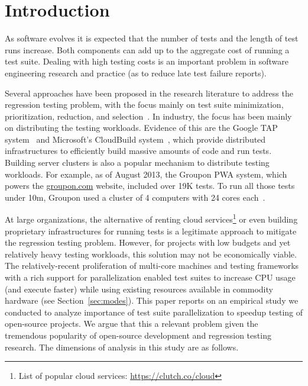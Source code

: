 \section{Introduction}


As software evolves it is expected that the number of tests and the
length of test runs increase.  Both components can add up to the
aggregate cost of running a test suite.  Dealing with high testing
costs is an important problem in software engineering research and
practice (as to reduce late test failure reports).

Several approaches have been proposed in the research literature to
address the regression testing problem, with the focus mainly on test
suite minimization, prioritization, reduction, and
selection~\cite{yoo-harman-stvr2012}.  In industry, the focus has been
mainly on distributing the testing workloads.  Evidence of this are
the Google TAP system~\cite{google-tap,google-ci} and Microsoft's
CloudBuild system~\cite{prasad-shulte-ieee-microsoft-ci}, which
provide distributed infrastructures to efficiently build massive
amounts of code and run tests.  Building server clusters is also a
popular mechanism to distribute testing workloads.  For example, as of
August 2013, the Groupon PWA system, which powers the
\url{groupon.com} website, included over 19K tests.  To run all those
tests under 10m, Groupon used a cluster of 4 computers with 24 cores
each~\cite{kim-etal-fse2013}.

At large organizations, the alternative of renting cloud
services\footnote{List of popular cloud services:
  \url{https://clutch.co/cloud}} or even building proprietary
infrastructures for running tests is a legitimate approach to mitigate
the regression testing problem.  However, for projects with low
budgets and yet relatively heavy testing workloads, this solution may
not be economically viable.  The relatively-recent proliferation of
multi-core machines and testing frameworks with a rich support for
parallelization enabled test suites to increase CPU usage (and execute
faster) while using existing resources available in commodity hardware
(see Section~\ref{sec:modes}).  This paper reports on an empirical
study we conducted to analyze importance of test suite parallelization
to speedup testing of open-source projects.  We argue that this a
relevant problem given the tremendous popularity of open-source
development and regression testing research.  The dimensions of
analysis in this study are as follows.



